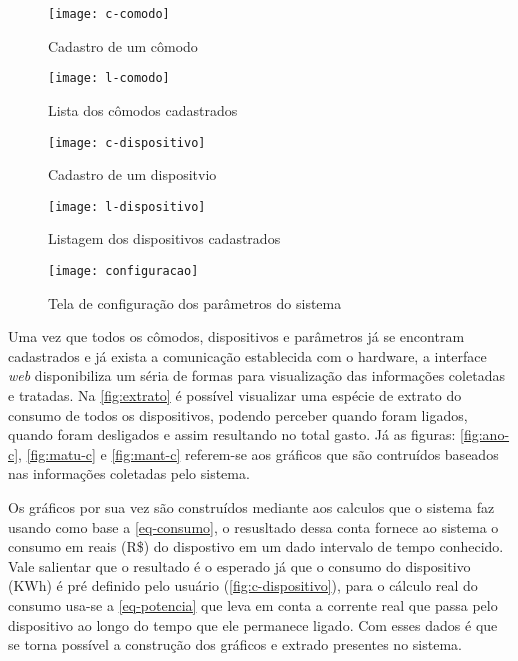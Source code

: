 \begin{figure}[h!]
	\texttt{[image: c-comodo]}
	\centering
	\caption[Cadastro de um cômodo]{Cadastro de um cômodo}
	\label{fig:c-comodo}
\end{figure}
\FloatBarrier

\begin{figure}[h!]
	\texttt{[image: l-comodo]}
	\centering
	\caption[Lista dos cômodos cadastrados]{Lista dos cômodos cadastrados}
	\label{fig:l-comodo}
\end{figure}
\FloatBarrier

\begin{figure}[h!]
	\texttt{[image: c-dispositivo]}
	\centering
	\caption[Cadastro de um dispositivo]{Cadastro de um dispositvio}
	\label{fig:c-dispositivo} 
\end{figure}
\FloatBarrier

\begin{figure}[h!]
	\texttt{[image: l-dispositivo]}
	\centering
	\caption[Listagem dos dispositivos cadastrados]{Listagem dos dispositivos cadastrados}
	\label{fig:l-dispositivo} 
\end{figure}
\FloatBarrier

\begin{figure}[h!]
	\texttt{[image: configuracao]}
	\centering
	\caption[Tela de configuração dos parâmetros do sistema]{Tela de configuração dos parâmetros do sistema}
	\label{fig:configuracao-ft} 
\end{figure}
\FloatBarrier

Uma vez que todos os cômodos, dispositivos e parâmetros já se encontram cadastrados e já exista a comunicação establecida com o hardware, a interface
\textit{web} disponibiliza um séria de formas para visualização das informações coletadas e tratadas. Na \autoref{fig:extrato} é possível visualizar
uma espécie de extrato do consumo de todos os dispositivos, podendo perceber quando foram ligados, quando foram desligados e assim resultando no total gasto.
Já as figuras: \ref{fig:ano-c}, \ref{fig:matu-c} e \ref{fig:mant-c} referem-se aos gráficos que são contruídos baseados nas informações coletadas pelo sistema.

Os gráficos por sua vez são construídos mediante aos calculos que o sistema faz usando como base a \autoref{eq-consumo}, o resusltado dessa conta
fornece ao sistema o consumo em reais (R\$) do dispostivo em um dado intervalo de tempo conhecido. Vale salientar que o resultado é o esperado já que o consumo
do dispositivo (KWh) é pré definido pelo usuário (\autoref{fig:c-dispositivo}), para o cálculo real do consumo usa-se a \autoref{eq-potencia} que leva em conta a corrente real que passa
pelo dispositivo ao longo do tempo que ele permanece ligado. Com esses dados é que se torna possível a construção dos gráficos e extrado presentes no sistema.

